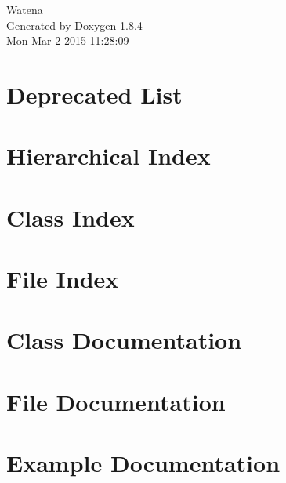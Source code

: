 \documentclass[twoside]{book}
\newcommand{\clearemptydoublepage}{%
  \newpage{\pagestyle{empty}\cleardoublepage}%
}
\begin{document}
\hypersetup{pageanchor=false}
\begin{titlepage}
\vspace*{7cm}
\begin{center}%
{\Large Watena }\\
\vspace*{1cm}
{\large Generated by Doxygen 1.8.4}\\
\vspace*{0.5cm}
{\small Mon Mar 2 2015 11:28:09}\\
\end{center}
\end{titlepage}
\clearemptydoublepage
\tableofcontents
\clearemptydoublepage
{}
\hypersetup{pageanchor=true}

\chapter{Deprecated List}
\label{deprecated}
\hypertarget{deprecated}{}

\chapter{Hierarchical Index}

\chapter{Class Index}

\chapter{File Index}

\chapter{Class Documentation}







































\chapter{File Documentation}

\chapter{Example Documentation}


\newpage
{}
{}
\printindex
\end{document}
